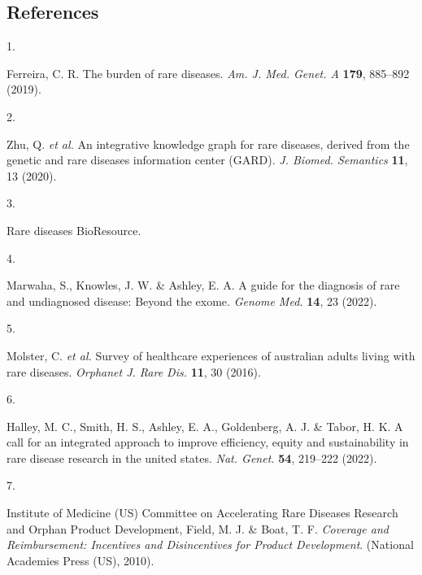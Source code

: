 \documentclass[
]{agujournal2019}
\newlength{\cslhangindent}
\newlength{\csllabelwidth}
\newenvironment{CSLReferences}[2] %
 {\begin{list}{}{%
  \setlength{\itemindent}{0pt}
  \setlength{\leftmargin}{0pt}
  \setlength{\parsep}{0pt}
  \ifodd #1
   \setlength{\leftmargin}{\cslhangindent}
   \setlength{\itemindent}{-1\cslhangindent}
  \fi
  \setlength{\itemsep}{#2\baselineskip}}}
 {\end{list}}
\newcommand{\CSLLeftMargin}[1]{\parbox[t]{\csllabelwidth}{\strut#1\strut}}
\newcommand{\CSLRightInline}[1]{\parbox[t]{\linewidth - \csllabelwidth}{\strut#1\strut}}
\begin{document}
\subsection*{References}\label{references}

\label{refs}
\begin{CSLReferences}{0}{0}
\vspace{1em}

\CSLLeftMargin{1. }%
\CSLRightInline{Ferreira, C. R. The burden of rare diseases. \emph{Am.
J. Med. Genet. A} \textbf{179}, 885--892 (2019).}

\CSLLeftMargin{2. }%
\CSLRightInline{Zhu, Q. \emph{et al.} An integrative knowledge graph for
rare diseases, derived from the genetic and rare diseases information
center ({GARD}). \emph{J. Biomed. Semantics} \textbf{11}, 13 (2020).}

\CSLLeftMargin{3. }%
\CSLRightInline{Rare diseases {BioResource}.}

\CSLLeftMargin{4. }%
\CSLRightInline{Marwaha, S., Knowles, J. W. \& Ashley, E. A. A guide for
the diagnosis of rare and undiagnosed disease: Beyond the exome.
\emph{Genome Med.} \textbf{14}, 23 (2022).}

\CSLLeftMargin{5. }%
\CSLRightInline{Molster, C. \emph{et al.} Survey of healthcare
experiences of australian adults living with rare diseases.
\emph{Orphanet J. Rare Dis.} \textbf{11}, 30 (2016).}

\CSLLeftMargin{6. }%
\CSLRightInline{Halley, M. C., Smith, H. S., Ashley, E. A., Goldenberg,
A. J. \& Tabor, H. K. A call for an integrated approach to improve
efficiency, equity and sustainability in rare disease research in the
united states. \emph{Nat. Genet.} \textbf{54}, 219--222 (2022).}

\CSLLeftMargin{7. }%
\CSLRightInline{Institute of Medicine (US) Committee on Accelerating
Rare Diseases Research and Orphan Product Development, Field, M. J. \&
Boat, T. F. \emph{Coverage and Reimbursement: Incentives and
Disincentives for Product Development}. (National Academies Press (US),
2010).}


\end{CSLReferences}
\end{document}

